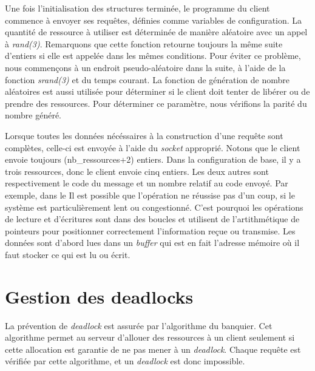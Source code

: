 \documentclass[letterpaper,12pt]{scrartcl}
\begin{document}
	Une fois l'initialisation des structures terminée, le programme du client commence à envoyer ses requêtes, définies comme variables de configuration. La quantité de ressource à utiliser est déterminée de manière aléatoire avec un appel à \textit{rand(3)}. Remarquons que cette fonction retourne toujours la même suite d'entiers si elle est appelée dans les mêmes conditions. Pour éviter ce problème, nous commençons à un endroit pseudo-aléatoire dans la suite, à l'aide de la fonction \textit{srand(3)} et du temps courant. La fonction de génération de nombre aléatoires est aussi utilisée pour déterminer si le client doit tenter de libérer ou de prendre des ressources. Pour déterminer ce paramètre, nous vérifions la parité du nombre généré. 

	Lorsque toutes les données nécéssaires à la construction d'une requête sont complètes, celle-ci est envoyée à l'aide du \textit{socket} approprié. Notons que le client envoie toujours (nb\_ressources+2) entiers. Dans la configuration de base, il y a trois ressources, donc le client envoie cinq entiers. Les deux autres sont respectivement le code du message et un nombre relatif au code envoyé. Par exemple, dans le  Il est possible que l'opération ne réussise pas d'un coup, si le système est particulièrement lent ou congestionné. C'est pourquoi les opérations de lecture et d'écritures sont dans des boucles et utilisent de l'artithmétique de pointeurs pour positionner correctement l'information reçue ou transmise. Les données sont d'abord lues dans un \textit{buffer} qui est en fait l'adresse mémoire où il faut stocker ce qui est lu ou écrit.

	\section{Gestion des deadlocks}
	La prévention de \emph{deadlock} est assurée par l'algorithme du banquier.
	Cet algorithme permet au serveur d'allouer des ressources à un client seulement si cette allocation est garantie de ne pas mener à un \emph{deadlock}.
	Chaque requête est vérifiée par cette algorithme, et un \emph{deadlock} est donc impossible.
\end{document}
